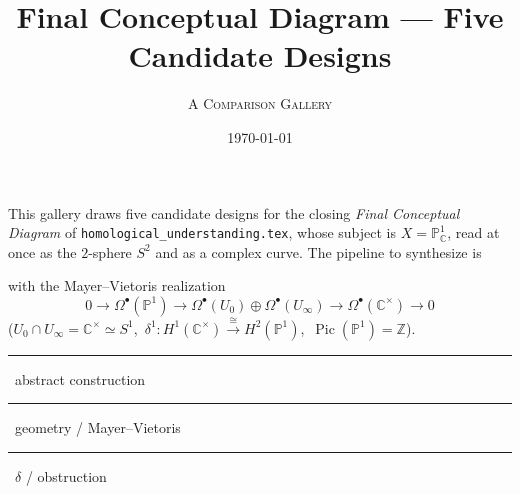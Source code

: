 \documentclass[11pt]{article}
\title{\bfseries Final Conceptual Diagram --- Five Candidate Designs}
\author{\textsc{A Comparison Gallery}}
\date{\today}
\newcommand{\CC}{\mathbb C}
\newcommand{\ZZ}{\mathbb Z}
\newcommand{\PP}{\mathbb P}
\newcommand{\Pic}{\operatorname{Pic}}
\begin{document}
\maketitle

\noindent This gallery draws five candidate designs for the closing
\emph{Final Conceptual Diagram} of \texttt{homological\_\allowbreak understanding.tex}, whose
subject is $X=\PP^1_\CC$, read at once as the $2$-sphere $S^2$ and as a complex
curve. The pipeline to synthesize is
\begin{center}
\end{center}
with the Mayer--Vietoris realization
\[
  0\to\Omega^\bullet(\PP^1)\to\Omega^\bullet(U_0)\oplus\Omega^\bullet(U_\infty)
   \to\Omega^\bullet(\CC^\times)\to0
\]
($U_0\cap U_\infty=\CC^\times\simeq S^1$,\ $\delta^1\colon H^1(\CC^\times)
\xrightarrow{\cong}H^2(\PP^1)$,\ $\Pic(\PP^1)=\ZZ$).

\begin{center}\footnotesize
\textcolor{inkblue}{\rule{9pt}{7pt}}\ abstract construction\qquad
\textcolor{zerogreen}{\rule{9pt}{7pt}}\ geometry / Mayer--Vietoris\qquad
\textcolor{polered}{\rule{9pt}{7pt}}\ $\delta$ / obstruction
\end{center}

\end{document}
